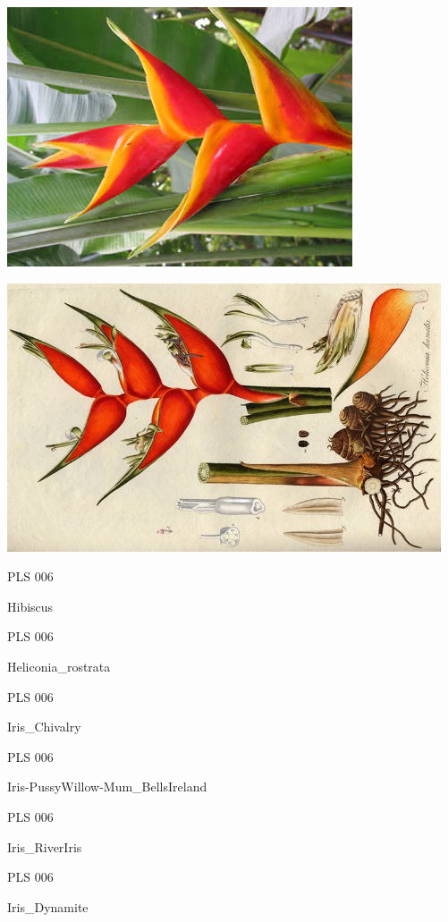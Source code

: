 \documentclass{article}
\begin{document}
\begin{center}
\includegraphics[height=0.925\paperheight]{../Heliconia.jpg}
\end{center}
\newpage

\begin{center}
\includegraphics[height=0.925\paperheight]{../Heliconia_humilisJacquin.jpg}
\end{center}
\newpage

\noindent  PLS 006
\vfill
\centerline{{\huge Hibiscus }}
\vfill
\newpage

\noindent  PLS 006
\vfill
\centerline{{\huge Heliconia\_rostrata }}
\vfill
\newpage

\noindent  PLS 006
\vfill
\centerline{{\huge Iris\_Chivalry }}
\vfill
\newpage

\noindent  PLS 006
\vfill
\centerline{{\huge Iris-PussyWillow-Mum\_BellsIreland }}
\vfill
\newpage

\noindent  PLS 006
\vfill
\centerline{{\huge Iris\_RiverIris }}
\vfill
\newpage

\noindent  PLS 006
\vfill
\centerline{{\huge Iris\_Dynamite }}
\vfill
\newpage
\end{document}
